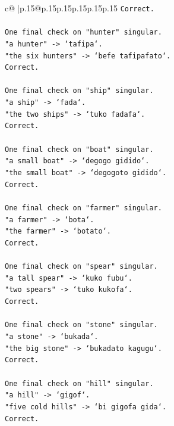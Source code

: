 \documentclass{article}
\begin{document}
{\begin{supertabular}{c@{$\;$}|p{.15\linewidth}@{}p{.15\linewidth}p{.15\linewidth}p{.15\linewidth}p{.15\linewidth}p{.15\linewidth}}
{{{\texttt{Correct.} \\
\\ 
\texttt{One final check on "hunter" singular.} \\
\texttt{"a hunter" {-}> `tafipa`.} \\
\texttt{"the six hunters" {-}> `befe tafipafato`.} \\
\texttt{Correct.} \\
\\ 
\texttt{One final check on "ship" singular.} \\
\texttt{"a ship" {-}> `fada`.} \\
\texttt{"the two ships" {-}> `tuko fadafa`.} \\
\texttt{Correct.} \\
\\ 
\texttt{One final check on "boat" singular.} \\
\texttt{"a small boat" {-}> `degogo gidido`.} \\
\texttt{"the small boat" {-}> `degogoto gidido`.} \\
\texttt{Correct.} \\
\\ 
\texttt{One final check on "farmer" singular.} \\
\texttt{"a farmer" {-}> `bota`.} \\
\texttt{"the farmer" {-}> `botato`.} \\
\texttt{Correct.} \\
\\ 
\texttt{One final check on "spear" singular.} \\
\texttt{"a tall spear" {-}> `kuko fubu`.} \\
\texttt{"two spears" {-}> `tuko kukofa`.} \\
\texttt{Correct.} \\
\\ 
\texttt{One final check on "stone" singular.} \\
\texttt{"a stone" {-}> `bukada`.} \\
\texttt{"the big stone" {-}> `bukadato kagugu`.} \\
\texttt{Correct.} \\
\\ 
\texttt{One final check on "hill" singular.} \\
\texttt{"a hill" {-}> `gigof`.} \\
\texttt{"five cold hills" {-}> `bi gigofa gida`.} \\
\texttt{Correct.} \\
\\ 
}}}
\end{supertabular}}
\end{document}
